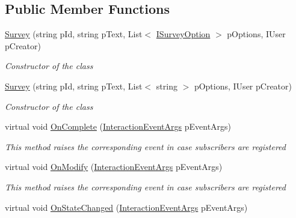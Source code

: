 \subsection*{Public Member Functions}
\begin{DoxyCompactItemize}
\item 
\hyperlink{class_plex_byte_1_1_mo_cap_1_1_interactions_1_1_survey_a9ae20c258ed6e6ae23d242e329d4c06d}{Survey} (string p\+Id, string p\+Text, List$<$ \hyperlink{interface_plex_byte_1_1_mo_cap_1_1_interactions_1_1_i_survey_option}{I\+Survey\+Option} $>$ p\+Options, I\+User p\+Creator)
\begin{DoxyCompactList}\small\item\em Constructor of the class \end{DoxyCompactList}\item 
\hyperlink{class_plex_byte_1_1_mo_cap_1_1_interactions_1_1_survey_a76483d76195182900935fcd0d2382940}{Survey} (string p\+Id, string p\+Text, List$<$ string $>$ p\+Options, I\+User p\+Creator)
\begin{DoxyCompactList}\small\item\em Constructor of the class \end{DoxyCompactList}\item 
virtual void \hyperlink{class_plex_byte_1_1_mo_cap_1_1_interactions_1_1_survey_ae9f1ca5ffacd44917eda7458a335cefa}{On\+Complete} (\hyperlink{class_plex_byte_1_1_mo_cap_1_1_interactions_1_1_interaction_event_args}{Interaction\+Event\+Args} p\+Event\+Args)
\begin{DoxyCompactList}\small\item\em This method raises the corresponding event in case subscribers are registered \end{DoxyCompactList}\item 
virtual void \hyperlink{class_plex_byte_1_1_mo_cap_1_1_interactions_1_1_survey_a08208db03d7006c21d38e60fa7bd41f9}{On\+Modify} (\hyperlink{class_plex_byte_1_1_mo_cap_1_1_interactions_1_1_interaction_event_args}{Interaction\+Event\+Args} p\+Event\+Args)
\begin{DoxyCompactList}\small\item\em This method raises the corresponding event in case subscribers are registered \end{DoxyCompactList}\item 
virtual void \hyperlink{class_plex_byte_1_1_mo_cap_1_1_interactions_1_1_survey_a895f47ec3591749c04dbcfb329d8fae0}{On\+State\+Changed} (\hyperlink{class_plex_byte_1_1_mo_cap_1_1_interactions_1_1_interaction_event_args}{Interaction\+Event\+Args} p\+Event\+Args)

\end{DoxyCompactItemize}
